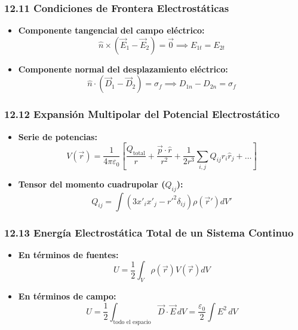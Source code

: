 \documentclass[11pt,a4paper]{article}
\begin{document}
\subsubsection*{12.11 Condiciones de Frontera Electrostáticas}

\begin{itemize}
  \item \textbf{Componente tangencial del campo eléctrico:}
  \[
    \hat{n} \times (\vec{E}_1 - \vec{E}_2) = \vec{0} \implies E_{1t} = E_{2t}
  \]
  \item \textbf{Componente normal del desplazamiento eléctrico:}
  \[
    \hat{n} \cdot (\vec{D}_1 - \vec{D}_2) = \sigma_f \implies D_{1n} - D_{2n} = \sigma_f
  \]
\end{itemize}

\subsubsection*{12.12 Expansión Multipolar del Potencial Electrostático}

\begin{itemize}
  \item \textbf{Serie de potencias:}
  \[
    V(\vec{r}) = \frac{1}{4\pi\varepsilon_0} \left[ \frac{Q_{\text{total}}}{r} + \frac{\vec{p} \cdot \hat{r}}{r^2} + \frac{1}{2 r^3} \sum_{i,j} Q_{ij} \hat{r}_i \hat{r}_j + \dots \right]
  \]
  \item \textbf{Tensor del momento cuadrupolar ($Q_{ij}$):}
  \[
    Q_{ij} = \int (3 x'_i x'_j - r'^2 \delta_{ij}) \rho(\vec{r}') dV'
  \]
\end{itemize}

\subsubsection*{12.13 Energía Electrostática Total de un Sistema Continuo}

\begin{itemize}
  \item \textbf{En términos de fuentes:}
  \[
    U = \frac{1}{2} \int_V \rho(\vec{r}) V(\vec{r}) dV
  \]
  \item \textbf{En términos de campo:}
  \[
    U = \frac{1}{2} \int_{\text{todo el espacio}} \vec{D} \cdot \vec{E} \, dV = \frac{\varepsilon_0}{2} \int E^2 \, dV
  \]
\end{itemize}
\end{document}
